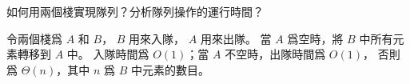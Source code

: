 如何用兩個棧實現隊列？分析隊列操作的運行時間？
\stopEXERCISE

\startANSWER
令兩個棧爲 $A$ 和 $B$， $B$ 用來入隊， $A$ 用來出隊。
當 $A$ 爲空時，將 $B$ 中所有元素轉移到 $A$ 中。
入隊時間爲 $O(1)$；當 $A$ 不空時，出隊時間爲 $O(1)$，
否則爲 $\Theta(n)$，其中 $n$ 爲 $B$ 中元素的數目。
\stopANSWER
